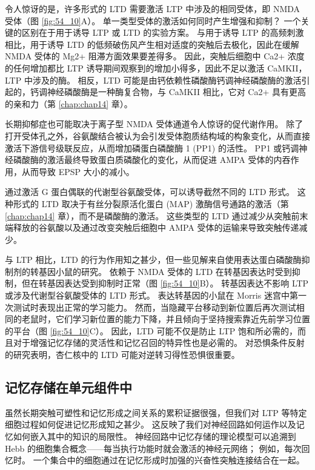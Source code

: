 令人惊讶的是，许多形式的 LTD 需要激活 LTP 中涉及的相同受体，即 NMDA 受体（图 \ref{fig:54_10}A）。
单一类型受体的激活如何同时产生增强和抑制？
一个关键的区别在于用于诱导 LTP 或 LTD 的实验方案。
与用于诱导 LTP 的高频刺激相比，用于诱导 LTD 的低频破伤风产生相对适度的突触后去极化，因此在缓解 NMDA 受体的 Mg2+ 阻滞方面效果要差得多。
因此，突触后细胞中 Ca2+ 浓度的任何增加都比 LTP 诱导期间观察到的增加小得多，因此不足以激活 CaMKII，LTP 中涉及的酶。
相反，LTD 可能是由钙依赖性磷酸酶钙调神经磷酸酶的激活引起的，钙调神经磷酸酶是一种酶复合物，与 CaMKII 相比，它对 Ca2+ 具有更高的亲和力（第 \ref{chap:chap14} 章）。


长期抑郁症也可能取决于离子型 NMDA 受体通道令人惊讶的促代谢作用。
除了打开受体孔之外，谷氨酸结合被认为会引发受体胞质结构域的构象变化，从而直接激活下游信号级联反应，从而增加磷蛋白磷酸酶 1 (PP1) 的活性。
PP1 或钙调神经磷酸酶的激活最终导致蛋白质磷酸化的变化，从而促进 AMPA 受体的内吞作用，从而导致 EPSP 大小的减小。


通过激活 G 蛋白偶联的代谢型谷氨酸受体，可以诱导截然不同的 LTD 形式。
这种形式的 LTD 取决于有丝分裂原活化蛋白 (MAP) 激酶信号通路的激活（第 \ref{chap:chap14} 章），而不是磷酸酶的激活。
这些类型的 LTD 通过减少从突触前末端释放的谷氨酸以及通过改变突触后细胞中 AMPA 受体的运输来导致突触传递减少。


与 LTP 相比，LTD 的行为作用知之甚少，但一些见解来自使用表达蛋白磷酸酶抑制剂的转基因小鼠的研究。
依赖于 NMDA 受体的 LTD 在转基因表达时受到抑制，但在转基因表达受到抑制时正常（图 \ref{fig:54_10}B）。
转基因表达不影响 LTP 或涉及代谢型谷氨酸受体的 LTD 形式。
表达转基因的小鼠在 Morris 迷宫中第一次测试时表现出正常的学习能力。
然而，当隐藏平台移动到新位置后再次测试相同的老鼠时，它们学习新位置的能力下降，并且倾向于坚持搜索靠近先前学习位置的平台（图 \ref{fig:54_10}C）。
因此，LTD 可能不仅是防止 LTP 饱和所必需的，而且对于增强记忆存储的灵活性和记忆召回的特异性也是必需的。
对恐惧条件反射的研究表明，杏仁核中的 LTD 可能对逆转习得性恐惧很重要。



\subsection{记忆存储在单元组件中}

虽然长期突触可塑性和记忆形成之间关系的累积证据很强，但我们对 LTP 等特定细胞过程如何促进记忆形成知之甚少。
这反映了我们对神经回路如何运作以及记忆如何嵌入其中的知识的局限性。
神经回路中记忆存储的理论模型可以追溯到 Hebb 的细胞集合概念——每当执行功能时就会激活的神经元网络；
例如，每次回忆时。
一个集合中的细胞通过在记忆形成时加强的兴奋性突触连接结合在一起。


